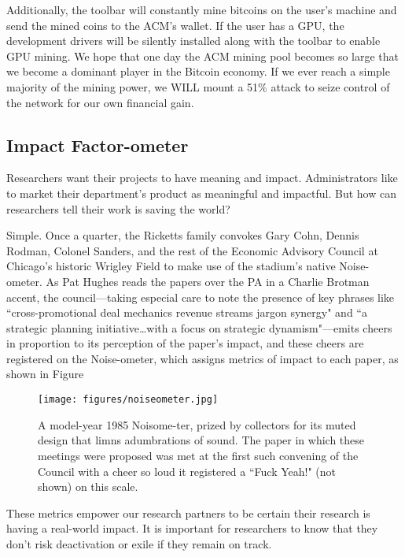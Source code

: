 Additionally, the toolbar will constantly mine bitcoins on the user's machine
and send the mined coins to the ACM's wallet.
If the user has a GPU, the development drivers will be silently installed along
with the toolbar to enable GPU mining.
We hope that one day the ACM mining pool becomes so large that we become a
dominant player in the Bitcoin economy.
If we ever reach a simple majority of the mining power, we WILL mount a 51\%
attack to seize control of the network for our own financial gain.

\subsection{Impact Factor-ometer}

Researchers want their projects to have meaning and impact. Administrators like to market their department's product as meaningful and impactful. But how can researchers tell their work is saving the world?

Simple. Once a quarter, the Ricketts family convokes Gary Cohn, Dennis Rodman, Colonel Sanders, and the rest of the Economic Advisory Council at Chicago's historic Wrigley Field to make use of the stadium's native Noise-ometer. As Pat Hughes reads the papers over the PA in a Charlie Brotman accent, the council---taking especial care to note the presence of key phrases like ``cross-promotional deal mechanics revenue streams jargon synergy" and ``a strategic planning initiative\ldots with a focus on strategic dynamism"---emits cheers in proportion to its perception of the paper's impact, and these cheers are registered on the Noise-ometer, which assigns metrics of impact to each paper, as shown in Figure 

\begin{figure}
  \centering
  \texttt{[image: figures/noiseometer.jpg]}
  \caption{A model-year 1985 Noisome-ter, prized by collectors for its muted design that limns adumbrations of sound. The paper in which these meetings were proposed was met at the first such convening of the Council with a cheer so loud it registered a ``Fuck Yeah!" (not shown) on this scale.}
  \label{fig:noiseometer}
\end{figure}

These metrics empower our research partners to be certain their research is having a real-world impact.  It is important for researchers to know that they don't risk deactivation or exile if they remain on track.
